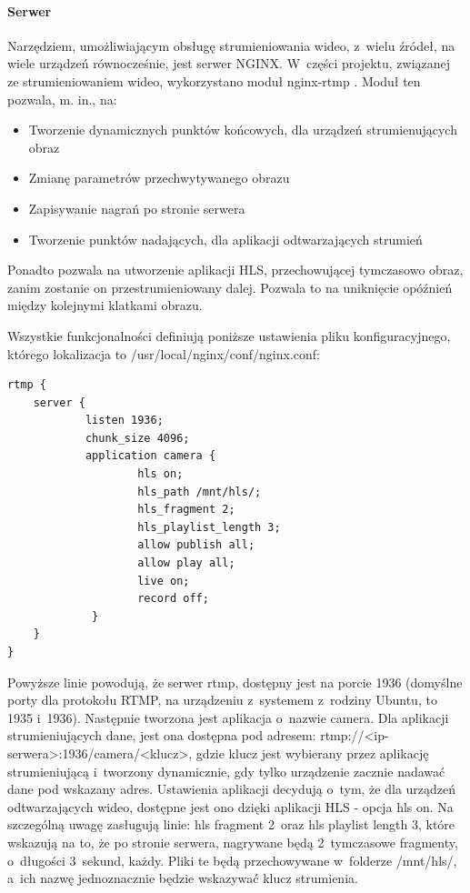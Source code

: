 \paragraph{Serwer}
Narzędziem, umożliwiającym obsługę strumieniowania wideo, z~wielu źródeł, na wiele urządzeń równocześnie, jest serwer NGINX. W~części projektu, związanej ze strumieniowaniem wideo, wykorzystano moduł nginx-rtmp \cite{NGINX}. 
Moduł ten pozwala, m. in., na:
\begin{itemize}
\item Tworzenie dynamicznych punktów końcowych, dla urządzeń strumienujących obraz
\item Zmianę parametrów przechwytywanego obrazu 
\item Zapisywanie nagrań po stronie serwera
\item Tworzenie punktów nadających, dla aplikacji odtwarzających strumień
\end{itemize}
Ponadto pozwala na utworzenie aplikacji HLS, przechowującej tymczasowo obraz, zanim zostanie on przestrumieniowany dalej. Pozwala to na uniknięcie opóźnień między kolejnymi klatkami obrazu.

Wszystkie funkcjonalności definiują poniższe ustawienia pliku konfiguracyjnego, którego lokalizacja to /usr/local/nginx/conf/nginx.conf:

\begin{verbatim}
rtmp {
    server {
            listen 1936;
            chunk_size 4096;
            application camera {
                    hls on;
                    hls_path /mnt/hls/;
                    hls_fragment 2;
                    hls_playlist_length 3;
                    allow publish all;
                    allow play all;
                    live on;
                    record off;
             }
    }
}
\end{verbatim}

Powyższe linie powodują, że serwer rtmp, dostępny jest na porcie 1936 (domyślne porty dla protokołu RTMP, na urządzeniu z~systemem z~rodziny Ubuntu,  to 1935 i~1936). Następnie tworzona jest aplikacja o~nazwie camera. Dla aplikacji strumieniujących dane, jest ona dostępna pod adresem: rtmp://<ip-serwera>:1936/camera/<klucz>, gdzie klucz jest wybierany przez aplikację strumieniującą i~tworzony dynamicznie, gdy tylko urządzenie zacznie nadawać dane pod wskazany adres.
Ustawienia aplikacji decydują o~tym, że dla urządzeń odtwarzających wideo, dostępne jest ono dzięki aplikacji HLS - opcja hls on. Na szczególną uwagę zasługują linie: hls fragment 2~oraz hls playlist length 3, które wskazują na to, że po stronie serwera, nagrywane będą 2~tymczasowe fragmenty, o~długości 3~sekund, każdy. Pliki te będą przechowywane w~folderze /mnt/hls/, a~ich nazwę jednoznacznie będzie wskazywać klucz strumienia.

